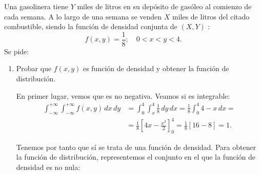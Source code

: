 \begin{ejercicio}
    Una gasolinera tiene $Y$ miles de litros en su depósito de gasóleo al comienzo de cada semana. A lo largo de una semana se venden $X$ miles de litros del citado combustible, siendo la función de densidad conjunta de $(X,Y)$ :
    \[
        f(x, y) = \frac{1}{8}; \quad 0 < x < y < 4.
    \]
    Se pide:
    \begin{enumerate}
        \item Probar que $f(x, y)$ es función de densidad y obtener la función de distribución.
        
        En primer lugar, vemos que es no negativa. Veamos si es integrable:
        \begin{align*}
            \int_{-\infty}^{+\infty} \int_{-\infty}^{+\infty} f(x, y) \, dx \, dy &= \int_{0}^{4} \int_{x}^{4} \frac{1}{8} \, dy \, dx = \frac{1}{8}\int_{0}^{4} 4-x \, dx =\\&= \frac{1}{8}\left[4x-\frac{x^2}{2}\right]_0^4 = \frac{1}{8}\left[16-8\right] = 1.
        \end{align*}

        Tenemos por tanto que sí se trata de una función de densidad.
        Para obtener la función de distribución, representemos el conjunto en el que la función de densidad es no nula:
        \begin{figure}[H]
            \centering
        \end{figure}


\end{enumerate}
\end{ejercicio}
